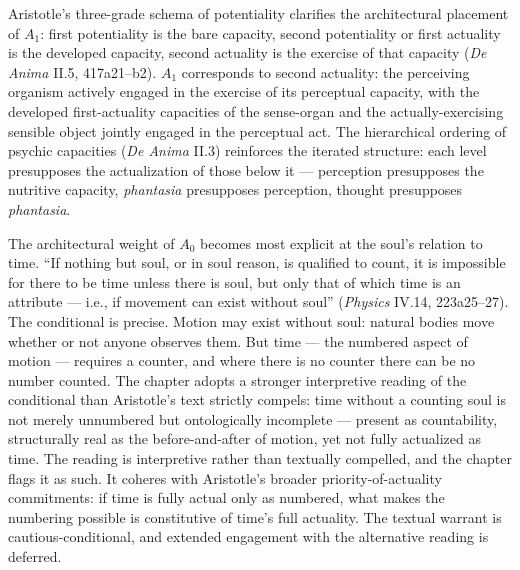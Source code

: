 Aristotle's three-grade schema of potentiality clarifies the architectural placement of $A_1$: first potentiality is the bare capacity, second potentiality or first actuality is the developed capacity, second actuality is the exercise of that capacity (\textit{De Anima} II.5, 417a21--b2). $A_1$ corresponds to second actuality: the perceiving organism actively engaged in the exercise of its perceptual capacity, with the developed first-actuality capacities of the sense-organ and the actually-exercising sensible object jointly engaged in the perceptual act. The hierarchical ordering of psychic capacities (\textit{De Anima} II.3) reinforces the iterated structure: each level presupposes the actualization of those below it --- perception presupposes the nutritive capacity, \textit{phantasia} presupposes perception, thought presupposes \textit{phantasia}.

The architectural weight of $A_0$ becomes most explicit at the soul's relation to time. ``If nothing but soul, or in soul reason, is qualified to count, it is impossible for there to be time unless there is soul, but only that of which time is an attribute --- i.e., if movement can exist without soul'' (\textit{Physics} IV.14, 223a25--27). The conditional is precise. Motion may exist without soul: natural bodies move whether or not anyone observes them. But time --- the numbered aspect of motion --- requires a counter, and where there is no counter there can be no number counted. The chapter adopts a stronger interpretive reading of the conditional than Aristotle's text strictly compels: time without a counting soul is not merely unnumbered but ontologically incomplete --- present as countability, structurally real as the before-and-after of motion, yet not fully actualized as time. The reading is interpretive rather than textually compelled, and the chapter flags it as such. It coheres with Aristotle's broader priority-of-actuality commitments: if time is fully actual only as numbered, what makes the numbering possible is constitutive of time's full actuality. The textual warrant is cautious-conditional, and extended engagement with the alternative reading is deferred.

